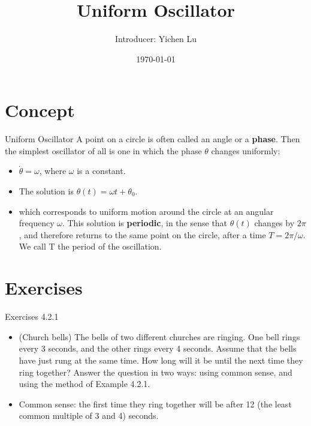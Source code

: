 \documentclass[10pt,aspectratio=43,mathserif,table]{beamer}
\title{Uniform Oscillator}
\author{Introducer: Yichen Lu\quad \newline  \newline \quad }
\institute{\fontsize{8pt}{14pt}}
\date{\today}
\newcommand{\concept}{Uniform Oscillator}
\begin{document}

\frame{\titlepage}


\section{Concept}

\begin{frame}{\concept}
A point on a circle is often called an angle or a \textbf{phase}. Then the simplest oscillator of all is one in which the phase $\theta$ changes uniformly:
	\begin{itemize}
		\item $\dot{\theta}=\omega$, where $\omega$ is a constant. 
		\item The solution is $\theta(t)=\omega t+\theta_0$. 
		\item which corresponds to uniform motion around the circle at an angular frequency $\omega$. This solution is \textbf{periodic}, in the sense that $\theta(t)$ changes by $2\pi$ , and therefore returns to the same point on the circle, after a time $T = 2\pi / \omega$. We call T the period of the oscillation.
	\end{itemize}
\end{frame}

\section{Exercises}

\begin{frame}{Exercises 4.2.1}

\begin{itemize}
	\item (Church bells) The bells of two different churches are ringing. One bell rings every 3 seconds, and the other rings every 4 seconds. Assume that the bells have just rung at the same time. How long will it be until the next time they ring together? Answer the question in two ways: using common sense, and using the method of Example 4.2.1.
	\item Common sense: the first time they ring together will be after 12 (the least common multiple of 3 and 4) seconds.
\end{itemize}

\end{frame}
\end{document}
